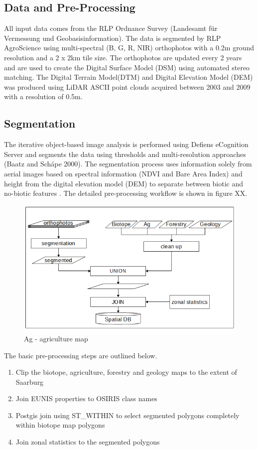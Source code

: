 \documentclass[authoryear, review,12pt,number]{elsarticle}
\begin{document}
\subsection{Data and Pre-Processing}
All input data comes from the RLP Ordnance Survey (Landesamt f\"ur Vermessung 
und Geobasisinformation). The data is segmented by RLP AgroScience using
multi-spectral (B, G, R, NIR) orthophotos with a 0.2m ground resolution and a
2 x 2km tile size. The orthophotos are updated every 2 years and are used to
create the Digital Surface Model (DSM) using automated stereo matching. The
Digital Terrain Model(DTM) and Digital Elevation Model (DEM) was produced using
LiDAR ASCII point clouds acquired between 2003 and 2009 with a resolution of
0.5m.\\
\subsection{Segmentation}
The iterative object-based image analysis is performed using Defiens eCognition Server
and segments the data using thresholds and multi-resolution approaches (Baatz and
Sch\'ape 2000). The segmentation process uses information solely from aerial
images based on spectral information (NDVI and Bare Area Index) and
height from the digital elevation model (DEM) to separate
between biotic and no-biotic features \citep{Tintrup2015}. 
The detailed pre-processing workflow is shown in figure XX.
\begin{figure}
	\includegraphics[width=1\textwidth]{diagrams/pre_processing.png}
	\caption{Ag - agriculture map}
\end{figure}

The basic pre-processing steps are outlined below.
\begin{enumerate}
    \item Clip the biotope, agriculture, forestry and geology maps to the extent
    of Saarburg
    \item Join EUNIS properties to OSIRIS class names
    \item Postgis join using ST\_WITHIN to select segmented polygons
    completely within biotope map polygons
    \item Join zonal statistics to the segmented polygons
\end{enumerate}
\end{document}
